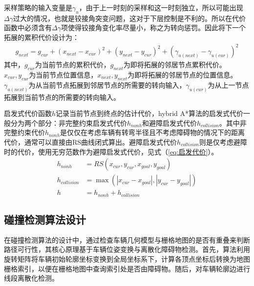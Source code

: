 \documentclass[master,academic]{ysuthesis} %
\begin{document}
		采样策略的输入变量是$\gamma_u$，由于上一时刻的采样和这一时刻独立，所以可能出现$\Delta {\gamma}$过大的情况，也就是铰接角突变问题，这对于下层控制是不利的。所以在代价函数中必须含有$\Delta {\gamma}$项使得铰接角变化率尽量小，称之为转向惩罚。因此将下一个拓展的累积代价设计为：
		\begin{equation}
			\begin{aligned}
				g_{next}=g_{cur}+ (x_{next}-x_{cur} ) ^2+ (y_{next}-y_{cur} ) ^2+ (\gamma _{u(next)}-\gamma _{u (cur)} ) ^2
			\end{aligned}
		\end{equation}
		其中，$g_{cur}$为当前节点的累积代价，$g_{next}$为即将拓展的邻居节点累积代价。$x_{cur},y_{cur}$为当前节点位置信息，$x_{next},y_{next}$为即将拓展的邻居节点的位置信息。$\gamma _{u(next)}$为从当前节点拓展到邻居节点的所需要的转向输入，$\gamma _{u(cur)}$为从上一节点拓展到当前节点的所需要的转向输入。

		启发式代价函数$h$记录当前节点到终点的估计代价，hybrid A*算法的启发式代价一般分为两个部分：非完整约束启发式代价$h_{nonh}$和避障启发式代价$h_{collision}$。其中非完整约束代价$h_{nonh}$是仅仅在考虑车辆有转弯半径且不考虑障碍物的情况下的距离代价，通常可以直接由RS曲线闭式算出。避障启发式代价$h_{collision}$则是仅考虑避障时的代价，使用无穷范数作为避障启发式代价，见式（\ref{eq:启发代价}）。
		\begin{equation}
			\begin{aligned}
				h_{nonh} &= RS(x_{cur},y_{cur},x_{goal},y_{goal})\\
				h_{collision} &= \max( |x_{cur}-x_{goal}|,|y_{cur}-y_{goal}|)\\
				h &= h_{nonh}+h_{collision}
			\end{aligned}
			\label{eq:启发代价}
		\end{equation}

		\subsection{碰撞检测算法设计}
		在碰撞检测算法的设计中，通过检查车辆几何模型与栅格地图的是否有重叠来判断路径可行性，其核心原理基于车辆位姿变换与离散化障碍物检测。首先，算法利用旋转矩阵将车辆初始轮廓坐标变换到全局坐标系下，计算各顶点坐标后转换为地图栅格索引，以便在栅格地图中查询索引处是否由障碍物。随后，对车辆轮廓边进行线段离散化检测。
		
\end{document}
